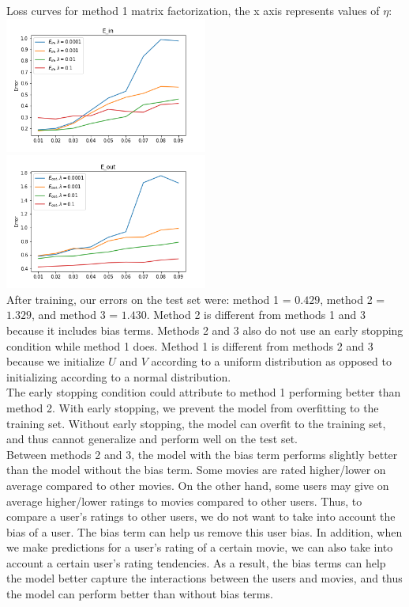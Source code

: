 \documentclass{article}
\begin{document}
Loss curves for method 1 matrix factorization, the x axis represents values of $\eta$:\\
\includegraphics[width=0.5\textwidth]{E_in vs Error.png}
\includegraphics[width=0.5\textwidth]{E_out vs Error.png}\\
After training, our errors on the test set were: method 1 = $0.429$, method 2 = $1.329$, and method 3 = $1.430$. Method 2 is different from methods 1 and 3 because it includes bias terms. Methods 2 and 3 also do not use an early stopping condition while method 1 does. Method 1 is different from methods 2 and 3 because we initialize $U$ and $V$ according to a uniform distribution as opposed to initializing according to a normal distribution. \\
The early stopping condition could attribute to method 1 performing better than method 2. With early stopping, we prevent the model from overfitting to the training set. Without early stopping, the model can overfit to the training set, and thus cannot generalize and perform well on the test set. \\

Between methods 2 and 3, the model with the bias term performs slightly better than the model without the bias term. Some movies are rated higher/lower on average compared to other movies. On the other hand, some users may give on average higher/lower ratings to movies compared to other users. Thus, to compare a user's ratings to other users, we do not want to take into account the bias of a user. The bias term can help us remove this user bias. In addition, when we make predictions for a user's rating of a certain movie, we can also take into account a certain user's rating tendencies. As a result, the bias terms can help the model better capture the interactions between the users and movies, and thus the model can perform better than without bias terms.
\end{document}
